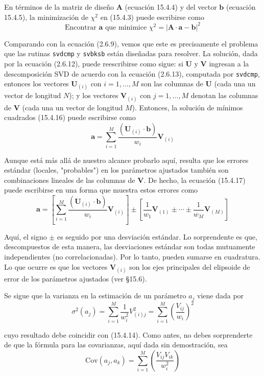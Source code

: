 \documentclass[10pt,a4paper]{book}
\begin{document}
En términos de la matriz de diseño $\mathbf{A}$ (ecuación 15.4.4) y del vector $\mathbf{b}$ (ecuación 15.4.5), la minimización de $\chi^2$ en (15.4.3) puede escribirse como
\[
\text{Encontrar } \mathbf{a} \text{ que minimice } \chi^2 = |\mathbf{A} \cdot \mathbf{a} - \mathbf{b}|^2 \tag{15.4.16}
\]

Comparando con la ecuación (2.6.9), vemos que este es precisamente el problema que las rutinas \texttt{svdcmp} y \texttt{svbksb} están diseñadas para resolver. La solución, dada por la ecuación (2.6.12), puede reescribirse como sigue: si $\mathbf{U}$ y $\mathbf{V}$ ingresan a la descomposición SVD de acuerdo con la ecuación (2.6.13), computada por \texttt{svdcmp}, entonces los vectores $\mathbf{U}_{(i)}$ con $i=1,\ldots,M$ son las columnas de $\mathbf{U}$ (cada una un vector de longitud $N$); y los vectores $\mathbf{V}_{(i)}$ con $j=1,\ldots,M$ denotan las columnas de $\mathbf{V}$ (cada una un vector de longitud $M$). Entonces, la solución de mínimos cuadrados (15.4.16) puede escribirse como
\[
\mathbf{a} = \sum_{i=1}^{M} \frac{(\mathbf{U}_{(i)} \cdot \mathbf{b})}{w_i} \mathbf{V}_{(i)} \tag{15.4.17}
\]

Aunque está más allá de nuestro alcance probarlo aquí, resulta que los errores estándar (locales, "probables") en los parámetros ajustados también son combinaciones lineales de las columnas de $\mathbf{V}$. De hecho, la ecuación (15.4.17) puede escribirse en una forma que muestra estos errores como
\[
\mathbf{a} = \left[ \sum_{i=1}^{M} \frac{(\mathbf{U}_{(i)} \cdot \mathbf{b})}{w_i} \mathbf{V}_{(i)} \right] \pm \left[ \frac{1}{w_1} \mathbf{V}_{(1)} \pm \cdots \pm \frac{1}{w_M} \mathbf{V}_{(M)} \right] \tag{15.4.18}
\]

Aquí, el signo $\pm$ es seguido por una desviación estándar. Lo sorprendente es que, descompuestos de esta manera, las desviaciones estándar son todas mutuamente independientes (no correlacionadas). Por lo tanto, pueden sumarse en cuadratura. Lo que ocurre es que los vectores $\mathbf{V}_{(i)}$ son los ejes principales del elipsoide de error de los parámetros ajustados (ver §15.6).

Se sigue que la varianza en la estimación de un parámetro $a_j$ viene dada por
\[
\sigma^2(a_j) = \sum_{i=1}^{M} \frac{1}{w_i^2} V_{(i)j}^2 = \sum_{i=1}^{M} \left( \frac{V_{ij}}{w_i} \right)^2 \tag{15.4.19}
\]

cuyo resultado debe coincidir con (15.4.14). Como antes, no debes sorprenderte de que la fórmula para las covarianzas, aquí dada sin demostración, sea
\[
\text{Cov}(a_j, a_k) = \sum_{i=1}^{M} \left( \frac{V_{ij} V_{ik}}{w_i^2} \right) \tag{15.4.20}
\]
\end{document}
